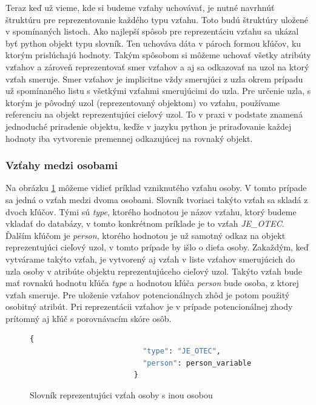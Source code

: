 Teraz keď už vieme, kde si budeme vzťahy uchovávať, je nutné navrhnúť štruktúru pre reprezentovanie každého typu vzťahu. Toto budú štruktúry uložené v spomínaných listoch. Ako najlepší spôsob pre reprezentáciu vzťahu sa ukázal byť python objekt typu slovník. Ten uchováva dáta v pároch formou kľúčov, ku ktorým prislúchajú hodnoty.
Takým spôsobom si môžeme uchovať všetky atribúty vzťahov a zároveň reprezentovať smer vzťahov a aj sa odkazovať na uzol na ktorý vzťah smeruje. Smer vzťahov je implicitne vždy smerujúci z uzla okrem prípadu už spomínaného listu s všetkými vzťahmi smerujúcimi do uzla. Pre určenie uzla, s ktorým je pôvodný uzol (reprezentovaný objektom) vo vzťahu, používame referenciu na objekt reprezentujúci cieľový uzol. To v praxi v podstate znamená jednoduché priradenie objektu, keďže v jazyku python je priraďovanie každej hodnoty iba vytvorenie premennej odkazujúcej na rovnaký objekt.

\subsubsection{Vzťahy medzi osobami}

Na obrázku \ref{relationship} môžeme vidieť príklad vzniknutého vzťahu osoby. V tomto prípade sa jedná o vzťah medzi dvoma osobami. Slovník tvoriaci takýto vzťah sa skladá z dvoch kľúčov. Tými sú \textit{type}, ktorého hodnotou je názov vzťahu, ktorý budeme vkladať do databázy, v tomto konkrétnom príklade je to vzťah \textit{JE\_OTEC}. Ďalším kľúčom je \textit{person}, ktorého hodnotou je už samotný odkaz na objekt reprezentujúci cieľový uzol, v tomto prípade by išlo o dieťa osoby. Zakaždým, keď vytvárame takýto vzťah, je vytvorený aj vzťah v liste vzťahov smerujúcich do uzla osoby v atribúte objektu reprezentujúceho cieľový uzol. Takýto vzťah bude mať rovnakú hodnotu kľúča \textit{type} a hodnotou kľúča \textit{person} bude osoba, z ktorej vzťah smeruje. Pre uloženie vzťahov potencionálnych zhôd je potom použitý osobitný atribút. Pri reprezentácii vzťahov je v prípade potencionálnej zhody prítomný aj kľúč s porovnávacím skóre osôb.

\begin{figure}[H]
    \centering
    \begin{lstlisting}[language=python]
                        {
                          "type": "JE_OTEC",
                          "person": person_variable
                        }              
    \end{lstlisting}
    \caption{Slovník reprezentujúci vzťah osoby s inou osobou}
    \label{relationship}
\end{figure}

